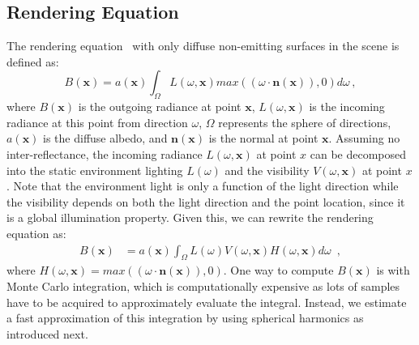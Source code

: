\subsection{Rendering Equation}
%
\label{render_equ}
%
The rendering equation~\cite{10.1145/15886.15902} with only diffuse non-emitting surfaces in the scene is defined as:
%
%
\begin{equation}
\label{eq:renderingEquation}
B(\mathbf{x})=a(\mathbf{x}) \int_{\Omega} L(\omega,\mathbf{x}) max((\omega\cdot\mathbf{n}(\mathbf{x})),0) d\omega\,,
\end{equation}
%
%
where $B(\mathbf{x})$ is the outgoing radiance at point $\mathbf{x}$, $L(\omega,\mathbf{x})$ is the incoming radiance at this point from direction $\omega$, $\Omega$ represents the sphere of directions, $a(\mathbf{x})$ is the diffuse albedo, and $\mathbf{n}(\mathbf{x})$ is the normal at point $\mathbf{x}$.
%
Assuming no inter-reflectance, the incoming radiance $L(\omega,\mathbf{x})$ at point $x$ can be decomposed into the static environment lighting $L(\omega)$ and the visibility $V(\omega,\mathbf{x})$ at point $x$. 
%
Note that the environment light is only a function of the light direction while the visibility depends on both the light direction and the point location, since it is a global illumination property. 
%
Given this, we can rewrite the rendering equation as:
%
%
\begin{equation}
\label{eq:render}
\begin{split}
B(\mathbf{x})&= a(\mathbf{x})\int_{\Omega} L(\omega) V(\omega,\mathbf{x}) H(\omega, \mathbf{x}) d\omega \enspace{,} 
\end{split}
\end{equation}
%
%
where $H(\omega, \mathbf{x}) = max((\omega\cdot\mathbf{n}(\mathbf{x})),0)$.
%
One way to compute $B(\mathbf{x})$ is with Monte Carlo integration, which is computationally expensive as lots of samples have to be acquired to approximately evaluate the integral.
%
Instead, we estimate a fast approximation of this integration by using spherical harmonics as introduced next. 
%
%
